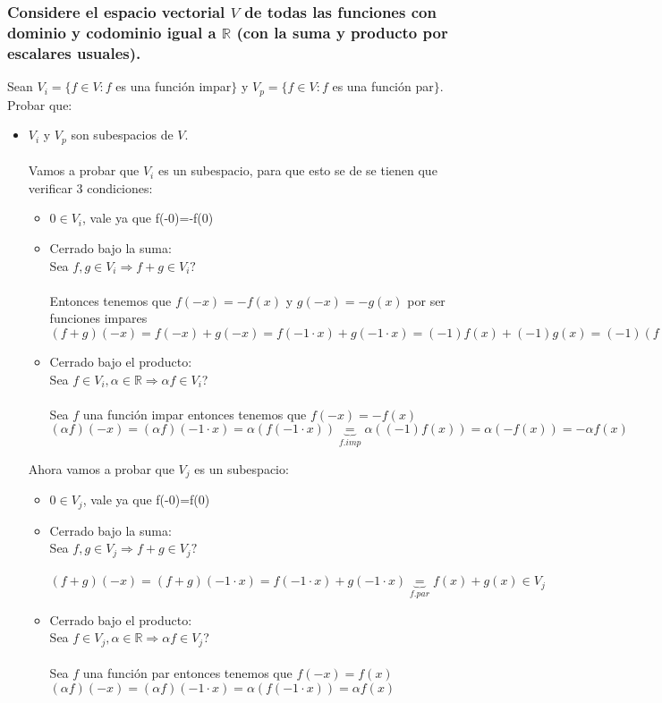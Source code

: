 \documentclass{article}
\begin{document}
\subsubsection{Considere el espacio vectorial $V$ de todas las funciones con dominio y codominio igual a
$\mathbb{R}$ (con la suma y producto por escalares usuales).}
Sean $V_i = \{ f \in V : f $ es una función impar$ \}$ y $V_p = \{ f \in V : f $ es una función par$\}$.
Probar que:
\begin{itemize}
	\item
		$V_i$ y $V_p$ son subespacios de $V$. \\ \\
		Vamos a probar que $V_i$ es un subespacio, para que esto se de se tienen que verificar 3 condiciones:
		\begin{itemize}
		\item
		        $0 \in V_i$, vale ya que f(-0)=-f(0)
		\item
		        Cerrado bajo la suma: \\
		        Sea $f,g \in V_i \Rightarrow f+g \in V_i ?$ \\ \\
		        Entonces tenemos que $f(-x) = -f(x)$ y $g(-x) = -g(x)$ por ser funciones impares\\
		        $(f+g)(-x) = f(-x)+g(-x) = f(-1 \cdot x) + g(-1 \cdot x) = (-1)f(x)+ (-1)g(x) =
		        (-1)(f+g)(x) = -(f+g)(x)$
		\item
		        Cerrado bajo el producto: \\
		        Sea $f \in V_i, \alpha \in \mathbb{R} \Rightarrow \alpha f \in V_i$? \\ \\
		        Sea $f$ una función impar entonces tenemos que $f(-x) = -f(x)$ \\
		        $(\alpha f)(-x) = (\alpha f)(-1 \cdot x) = \alpha (f(-1 \cdot x)) \underbrace{=}_{f.imp} \alpha((-1)f(x)) =
		        \alpha(-f(x)) = -\alpha f(x) $ \\
		\end{itemize}
		Ahora vamos a probar que $V_j$ es un subespacio:
		\begin{itemize}
			\item
			        $0 \in V_j$, vale ya que f(-0)=f(0)
			\item
			        Cerrado bajo la suma: \\
		        	Sea $f,g \in V_j \Rightarrow f+g \in V_j ?$ \\ \\
			        $(f+g)(-x) = (f+g)(-1 \cdot x)= f(-1 \cdot x)+g(-1 \cdot x) \underbrace{=}_{f.par} f(x) + g(x) \in V_j$
			\item
			        Cerrado bajo el producto: \\
			        Sea $f \in V_j, \alpha \in \mathbb{R} \Rightarrow \alpha f \in V_j$? \\ \\
			        Sea $f$ una función par entonces tenemos que $f(-x) = f(x)$ \\
			        $(\alpha f)(-x) = (\alpha f)(-1 \cdot x) = \alpha (f(-1 \cdot x))= \alpha f(x)$
		\end{itemize}


\end{itemize}
\end{document}
